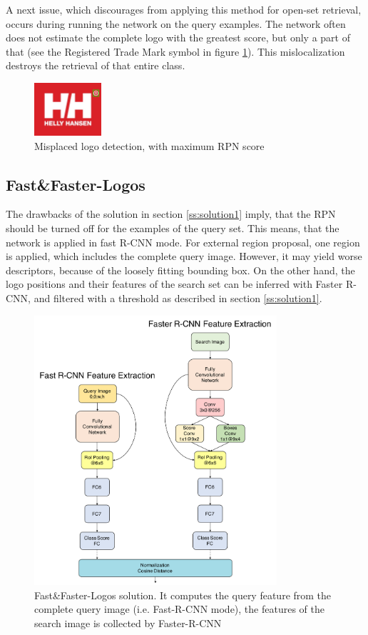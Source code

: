 A next issue, which discourages from applying this method for open-set retrieval, occurs during running the network on the query examples. The network often does not estimate the complete logo with the greatest score, but only a part of that (see the Registered Trade Mark symbol in figure \ref{f:missdet}). This mislocalization destroys the retrieval of that entire class.
\begin{figure}
  \centering
  \includegraphics[width=25mm]{images/mt/missdet.jpg}
  \caption{Misplaced logo detection, with maximum RPN score}
  \label{f:missdet}
\end{figure}
\subsection{Fast\&Faster-Logos}\label{ss:solution2}
The drawbacks of the solution in section \ref{ss:solution1} imply, that the RPN should be turned off for the examples of the query set. This means, that the network is applied in fast R-CNN mode. For external region proposal, one region is applied, which includes the complete query image. However, it may yield worse descriptors, because of the loosely fitting bounding box. On the other hand, the logo positions and their features of the search set can be inferred with Faster R-CNN, and filtered with a threshold as described in section \ref{ss:solution1}.
\begin{figure}
  \centering
  \includegraphics[width=90mm]{images/mt/sol2_arch.pdf}
  \caption{Fast\&Faster-Logos solution. It computes the query feature from the complete query image (i.e. Fast-R-CNN mode), the features of the search image is collected by Faster-R-CNN}
  \label{f:sol2arch}
\end{figure}
